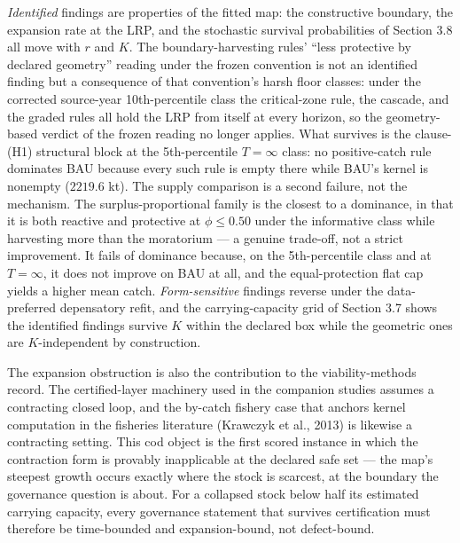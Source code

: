 \emph{Identified} findings are properties of the fitted map: the
constructive boundary, the expansion rate at the LRP, and the stochastic
survival probabilities of Section 3.8 all move with \(r\) and \(K\). The
boundary-harvesting rules' ``less protective by declared geometry''
reading under the frozen convention is not an identified finding but a
consequence of that convention's harsh floor classes: under the
corrected source-year 10th-percentile class the critical-zone rule, the
cascade, and the graded rules all hold the LRP from itself at every
horizon, so the geometry-based verdict of the frozen reading no longer
applies. What survives is the clause-(H1) structural block at the
5th-percentile \(T=\infty\) class: no positive-catch rule dominates BAU
because every such rule is empty there while BAU's kernel is nonempty
(\(2219.6\) kt). The supply comparison is a second failure, not the
mechanism. The surplus-proportional family is the closest to a
dominance, in that it is both reactive and protective at
\(\phi \le 0.50\) under the informative class while harvesting more than
the moratorium --- a genuine trade-off, not a strict improvement. It
fails of dominance because, on the 5th-percentile class and at
\(T=\infty\), it does not improve on BAU at all, and the
equal-protection flat cap yields a higher mean catch.
\emph{Form-sensitive} findings reverse under the data-preferred
depensatory refit, and the carrying-capacity grid of Section 3.7 shows
the identified findings survive \(K\) within the declared box while the
geometric ones are \(K\)-independent by construction.

The expansion obstruction is also the contribution to the
viability-methods record. The certified-layer machinery used in the
companion studies assumes a contracting closed loop, and the by-catch
fishery case that anchors kernel computation in the fisheries literature
(Krawczyk et al., 2013) is likewise a contracting setting. This cod
object is the first scored instance in which the contraction form is
provably inapplicable at the declared safe set --- the map's steepest
growth occurs exactly where the stock is scarcest, at the boundary the
governance question is about. For a collapsed stock below half its
estimated carrying capacity, every governance statement that survives
certification must therefore be time-bounded and expansion-bound, not
defect-bound.

